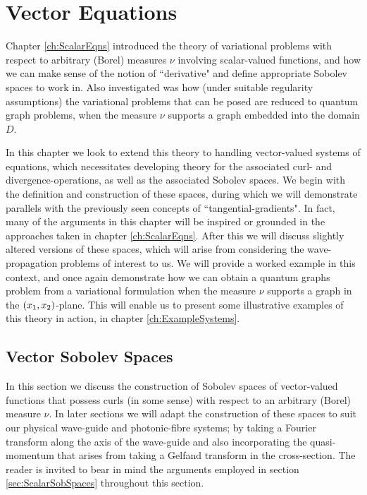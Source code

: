 \chapter{Vector Equations} \label{ch:VectorEqns}
Chapter \ref{ch:ScalarEqns} introduced the theory of variational problems with respect to arbitrary (Borel) measures $\nu$ involving scalar-valued functions, and how we can make sense of the notion of ``derivative" and define appropriate Sobolev spaces to work in.
Also investigated was how (under suitable regularity assumptions) the variational problems that can be posed are reduced to quantum graph problems, when the measure $\nu$ supports a graph embedded into the domain $D$. \newline

In this chapter we look to extend this theory to handling vector-valued systems of equations, which necessitates developing theory for the associated curl- and divergence-operations, as well as the associated Sobolev spaces.
We begin with the definition and construction of these spaces, during which we will demonstrate parallels with the previously seen concepts of ``tangential-gradients".
In fact, many of the arguments in this chapter will be inspired or grounded in the approaches taken in chapter \ref{ch:ScalarEqns}.
After this we will discuss slightly altered versions of these spaces, which will arise from considering the wave-propagation problems of interest to us.
We will provide a worked example in this context, and once again demonstrate how we can obtain a quantum graphs problem from a variational formulation when the measure $\nu$ supports a graph in the $\left( x_1,x_2 \right)$-plane.
This will enable us to present some illustrative examples of this theory in action, in chapter \ref{ch:ExampleSystems}.

\section{Vector Sobolev Spaces} \label{sec:VectorSobSpaces}
In this section we discuss the construction of Sobolev spaces of vector-valued functions that possess curls (in some sense) with respect to an arbitrary (Borel) measure $\nu$.
In later sections we will adapt the construction of these spaces to suit our physical wave-guide and photonic-fibre systems; by taking a Fourier transform along the axis of the wave-guide and also incorporating the quasi-momentum that arises from taking a Gelfand transform in the cross-section.
The reader is invited to bear in mind the arguments employed in section \ref{sec:ScalarSobSpaces} throughout this section. \newline

